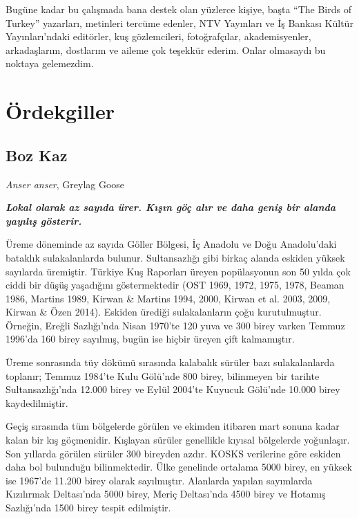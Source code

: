 \documentclass[
  letterpaper,
  DIV=11,
  numbers=noendperiod]{scrreprt}
\begin{document}
Bugüne kadar bu çalışmada bana destek olan yüzlerce kişiye, başta ``The
Birds of Turkey'' yazarları, metinleri tercüme edenler, NTV Yayınları ve
İş Bankası Kültür Yayınları'ndaki editörler, kuş gözlemcileri,
fotoğrafçılar, akademisyenler, arkadaşlarım, dostlarım ve aileme çok
teşekkür ederim. Onlar olmasaydı bu noktaya gelemezdim.


\chapter{Ördekgiller}\label{uxf6rdekgiller}

\section{Boz Kaz}\label{boz-kaz}

\emph{Anser anser}, Greylag Goose

\textbf{\emph{Lokal olarak az sayıda ürer. Kışın göç alır ve daha geniş
bir alanda yayılış gösterir.}}

Üreme döneminde az sayıda Göller Bölgesi, İç Anadolu ve Doğu
Anadolu'daki bataklık sulakalanlarda bulunur. Sultansazlığı gibi birkaç
alanda eskiden yüksek sayılarda üremiştir. Türkiye Kuş Raporları üreyen
popülasyonun son 50 yılda çok ciddi bir düşüş yaşadığını göstermektedir
(OST 1969, 1972, 1975, 1978, Beaman 1986, Martins 1989, Kirwan \&
Martins 1994, 2000, Kirwan et al. 2003, 2009, Kirwan \& Özen 2014).
Eskiden ürediği sulakalanların çoğu kurutulmuştur. Örneğin, Ereğli
Sazlığı'nda Nisan 1970'te 120 yuva ve 300 birey varken Temmuz 1996'da
160 birey sayılmış, bugün ise hiçbir üreyen çift kalmamıştır.

Üreme sonrasında tüy dökümü sırasında kalabalık sürüler bazı
sulakalanlarda toplanır; Temmuz 1984'te Kulu Gölü'nde 800 birey,
bilinmeyen bir tarihte Sultansazlığı'nda 12.000 birey ve Eylül 2004'te
Kuyucuk Gölü'nde 10.000 birey kaydedilmiştir.

Geçiş sırasında tüm bölgelerde görülen ve ekimden itibaren mart sonuna
kadar kalan bir kış göçmenidir. Kışlayan sürüler genellikle kıyısal
bölgelerde yoğunlaşır. Son yıllarda görülen sürüler 300 bireyden azdır.
KOSKS verilerine göre eskiden daha bol bulunduğu bilinmektedir. Ülke
genelinde ortalama 5000 birey, en yüksek ise 1967'de 11.200 birey olarak
sayılmıştır. Alanlarda yapılan sayımlarda Kızılırmak Deltası'nda 5000
birey, Meriç Deltası'nda 4500 birey ve Hotamış Sazlığı'nda 1500 birey
tespit edilmiştir.
\end{document}
